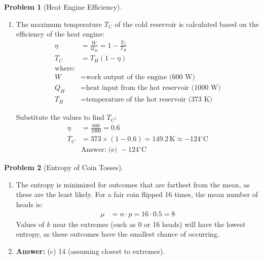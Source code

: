 \documentclass[12pt]{article}
\theoremstyle{definition} %
\newtheorem{problem}{Problem}
\theoremstyle{plain} %
\begin{document}
\begin{problem}[Heat Engine Efficiency]
    \noindent
    \begin{enumerate}
        \item 
        The maximum temperature \( T_C \) of the cold reservoir is calculated based on the efficiency of the heat engine:
        \begin{align*}
        \eta &= \frac{W}{Q_H} = 1 - \frac{T_C}{T_H} \\
        T_C &= T_H (1 - \eta) \\
        \text{where:} \\
        W &= \text{work output of the engine (600 W)} \\
        Q_H &= \text{heat input from the hot reservoir (1000 W)} \\
        T_H &= \text{temperature of the hot reservoir (373 K)}
        \end{align*}

        Substitute the values to find \( T_C \):
        \begin{align*}
        \eta &= \frac{600}{1000} = 0.6 \\
        T_C &= 373 \times (1 - 0.6) = 149.2 \, \text{K} \approx -124^\circ \text{C} \\
        &\text{Answer: (e) } -124^\circ \text{C}
        \end{align*}
    \end{enumerate}
\end{problem}
\begin{problem}[Entropy of Coin Tosses]
    \noindent
    \begin{enumerate}
        \item 
        The entropy is minimized for outcomes that are farthest from the mean, as these are the least likely. For a fair coin flipped 16 times, the mean number of heads is:
        \begin{align*}
        \mu &= n \cdot p = 16 \cdot 0.5 = 8
        \end{align*}
        Values of \( k \) near the extremes (such as 0 or 16 heads) will have the lowest entropy, as these outcomes have the smallest chance of occurring.

        \item 
        \textbf{Answer:} (c) 14 (assuming closest to extremes).
    \end{enumerate}
\end{problem}
\end{document}
